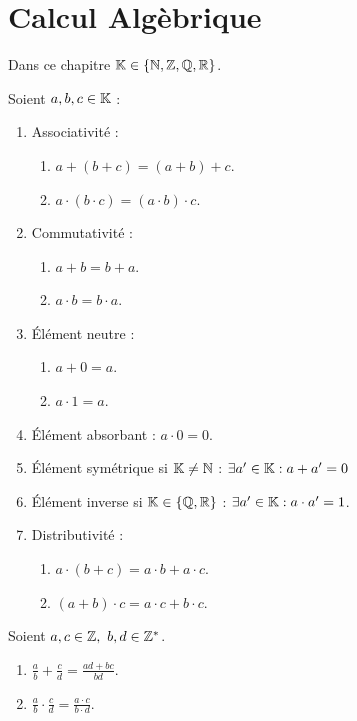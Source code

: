 \chapter{Calcul Algèbrique}
\def\arraystretch{1}

\par \noindent Dans ce chapitre $\mathbb{K} \in \{ \mathbb{N}, \mathbb{Z}, \mathbb{Q}, \mathbb{R} \}$.

\begin{proposition}
    Soient $a, b, c \in \mathbb{K}$ :
    \begin{enumerate}
    	\item Associativité :
    	\begin{enumerate}
    		\item $a + (b + c) = (a + b) + c$.
    		\item $a \cdot (b \cdot c) = (a \cdot b) \cdot c$.
    	\end{enumerate}
    	\item Commutativité : 
    	\begin{enumerate}
    		\item $a + b = b + a$.
    		\item $a \cdot b = b \cdot a$.
    	\end{enumerate}
    	\item \'Elément neutre :
    	\begin{enumerate}
    		\item $a + 0 = a$.
    		\item $a \cdot 1 = a$.
    	\end{enumerate}
    	\item \'Elément absorbant : $a \cdot 0 = 0$.
    	\item \'Elément symétrique si $\mathbb{K} \neq \mathbb{N}$ : $\exists a' \in \mathbb{K} : a + a' = 0$
    	\item \'Elément inverse si $\mathbb{K} \in \{\mathbb{Q}, \mathbb{R}\}$ : $\exists a' \in \mathbb{K} : a \cdot a' = 1$.
    	\item Distributivité :
    	\begin{enumerate}
    		\item $a \cdot (b + c) = a \cdot b + a \cdot c$.
    		\item $(a + b) \cdot c = a \cdot c + b \cdot c$.
    	\end{enumerate}
    \end{enumerate}
\end{proposition}

\begin{proposition}
    Soient $a, c \in \mathbb{Z},\ b, d \in \mathbb{Z}^*$.
    \begin{enumerate}
    	\item $\frac{a}{b} + \frac{c}{d} = \frac{ad + bc}{bd}$.
    	\item $\frac{a}{b} \cdot \frac{c}{d} = \frac{a \cdot c}{b \cdot d}$.
    \end{enumerate}
\end{proposition}

